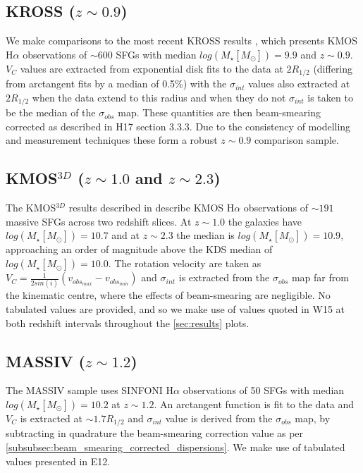 \documentclass[fleqn,usenatbib]{mn2e}
\begin{document}
\subsection{KROSS ($z\sim0.9$)}\label{subsec:KROSS}
We make comparisons to the most recent KROSS results \citep[H17]{Harrison2017}, which presents KMOS H$\alpha$ observations of $\sim600$ SFGs with median $log(M_{\star}[M_{\odot}])=9.9$ and $z\sim0.9$.
$V_{C}$ values are extracted from exponential disk fits to the data at $2R_{1/2}$ (differing from arctangent fits by a median of 0.5\%) with the $\sigma_{int}$ values also extracted at $2R_{1/2}$ when the data extend to this radius and when they do not $\sigma_{int}$ is taken to be the median of the $\sigma_{obs}$ map.
These quantities are then beam-smearing corrected as described in H17 section 3.3.3. 
Due to the consistency of modelling and measurement techniques these form a robust $z\sim0.9$ comparison sample.

\subsection{KMOS$^{3D}$ ($z\sim1.0$ and $z\sim2.3$)}\label{subsec:kmos_3d}
The KMOS$^{3D}$ results described in \cite[W15]{Wisnioski2015} describe KMOS H$\alpha$ observations of $\sim191$ massive SFGs across two redshift slices. 
At $z \sim 1.0$ the galaxies have $log(M_{\star}[M_{\odot}])=10.7$ and at $z \sim 2.3$ the median is $log(M_{\star}[M_{\odot}])=10.9$, approaching an order of magnitude above the KDS median of $log(M_{\star}[M_{\odot}])=10.0$.   The rotation velocity are taken as $V_{C} = \frac{1}{2sin(i)}(v_{obs_{max}} - v_{obs_{min}})$ and $\sigma_{int}$ is extracted from the $\sigma_{obs}$ map far from the kinematic centre, where the effects of beam-smearing are negligible.
No tabulated values are provided, and so we make use of values quoted in W15 at both redshift intervals throughout the \cref{sec:results} plots.

\subsection{MASSIV ($z\sim1.2$)}\label{subsec:MASSIV}
The MASSIV sample \citep[E12]{Epinat2012} uses SINFONI H$\alpha$ observations of 50 SFGs with median $log(M_{\star}[M_{\odot}])=10.2$ at $z\sim1.2$.
An arctangent function is fit to the data and $V_{C}$ is extracted at $\sim1.7R_{1/2}$ and $\sigma_{int}$ value is derived from the $\sigma_{obs}$ map, by subtracting in quadrature the beam-smearing correction value as per \cref{subsubsec:beam_smearing_corrected_dispersions}.
We make use of tabulated values presented in E12.
\end{document}
